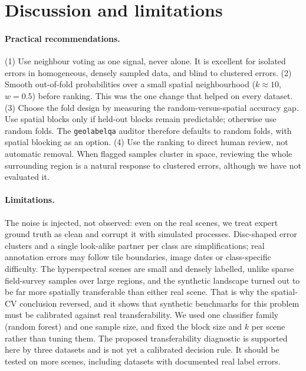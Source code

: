 \documentclass[11pt]{article}
\begin{document}
\section{Discussion and limitations}

\paragraph{Practical recommendations.}
(1) Use neighbour voting as one signal, never alone. It is excellent for isolated
errors in homogeneous, densely sampled data, and blind to clustered errors.
(2) Smooth out-of-fold probabilities over a small spatial neighbourhood
($k\approx10$, $w=0.5$) before ranking. This was the one change that helped on
every dataset. (3) Choose the fold design by measuring the random-versus-spatial
accuracy gap. Use spatial blocks only if held-out blocks remain predictable;
otherwise use random folds. The \texttt{geolabelqa} auditor therefore defaults to
random folds, with spatial blocking as an option. (4) Use the ranking to direct
human review, not automatic removal. When flagged samples cluster in space,
reviewing the whole surrounding region is a natural response to clustered errors,
although we have not evaluated it.

\paragraph{Limitations.}
The noise is injected, not observed: even on the real scenes, we treat expert
ground truth as clean and corrupt it with simulated processes. Disc-shaped error
clusters and a single look-alike partner per class are simplifications; real
annotation errors may follow tile boundaries, image dates or class-specific
difficulty. The hyperspectral scenes are small and densely labelled, unlike
sparse field-survey samples over large regions, and the synthetic landscape
turned out to be far more spatially transferable than either real scene. That is
why the spatial-CV conclusion reversed, and it shows that synthetic benchmarks for
this problem must be calibrated against real transferability. We used one
classifier family (random forest) and one sample size, and fixed the block size
and $k$ per scene rather than tuning them. The proposed transferability diagnostic
is supported here by three datasets and is not yet a calibrated decision rule. It
should be tested on more scenes, including datasets with documented real label
errors.
\end{document}
